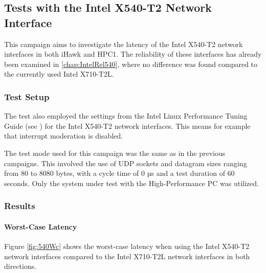 \subsection{Tests with the Intel X540-T2 Network Interface}
This campaign aims to investigate the latency of the Intel X540-T2 network interfaces in both iHawk and HPC1. The reliability of these interfaces has already been examined in \ref{chap:IntelRel540}, where no difference was found compared to the currently used Intel X710-T2L.

\subsubsection{Test Setup}
The test also employed the settings from the Intel Linux Performance Tuning Guide (see \cite{intermod03}) for the Intel X540-T2 network interfaces. This means for example that interrupt moderation is disabled.

The test mode used for this campaign was the same as in the previous campaigns. This involved the use of UDP sockets and datagram sizes ranging from 80 to 8080 bytes, with a cycle time of 0 µs and a test duration of 60 seconds. Only the system under test with the High-Performance PC was utilized.

\subsubsection{Results}
\paragraph{Worst-Case Latency}

Figure \ref{fig:540Wc} shows the worst-case latency when using the Intel X540-T2 network interfaces compared to the Intel X710-T2L network interfaces in both directions.

